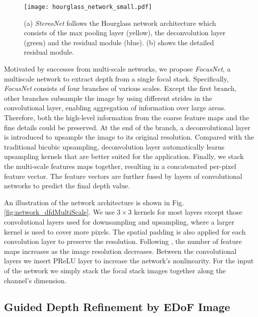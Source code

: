 \documentclass[10pt,twocolumn,letterpaper]{article}
\begin{document}
\begin{figure*}[t]
\begin{center}
   \texttt{[image: hourglass\_network\_small.pdf]}
\end{center}
\vspace{-8pt}
   \caption{(a) \emph{StereoNet} follows the Hourglass network architecture which consists of the max pooling layer (yellow), the deconvolution layer (green) and the residual module (blue). (b) shows the detailed residual module.}
\label{fig:network_hourglass}
\end{figure*}


Motivated by successes from multi-scale networks, we propose \emph{FocusNet}, a multiscale network to extract depth from a single focal stack. Specifically, \emph{FocusNet} consists of four branches of various scales. Except the first branch, other branches subsample the image by using different strides in the convolutional layer, enabling aggregation of information over large areas. Therefore, both the high-level information from the coarse feature maps and the fine details could be preserved. At the end of the branch, a deconvolutional layer is introduced to upsample the image to its original resolution. Compared with the traditional bicubic upsampling, deconvolution layer automatically learns upsampling kernels that are better suited for the application. Finally, we stack the multi-scale features maps together, resulting in a concatenated per-pixel feature vector. The feature vectors are further fused by layers of convolutional networks to predict the final depth value.

An illustration of the network architecture is shown in Fig. \ref{fig:network_dfdMultiScale}. We use $3\times3$ kernels for most layers except those convolutional layers used for downsampling and upsampling, where a larger kernel is used to cover more pixels. The spatial padding is also applied for each convolution layer to preserve the resolution. Following \cite{simonyan14}, the number of feature maps increases as the image resolution decreases. Between the convolutional layers we insert PReLU layer \cite{he15} to increase the network's nonlinearity. For the input of the network we simply stack the focal stack images together along the channel's dimension.


\subsection{Guided Depth Refinement by EDoF Image}
\label{section:allinfocus}
\end{document}

